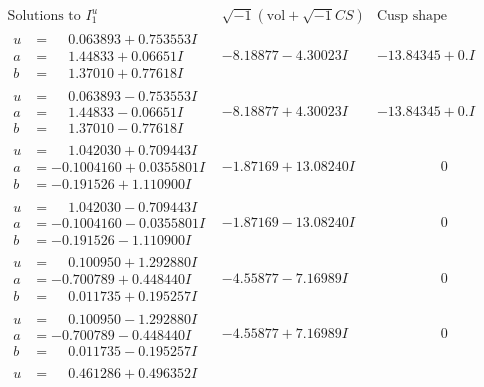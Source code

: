 \documentclass[1p]{elsarticle_modified}
\theoremstyle{definition}
\newcommand{\I}{\sqrt{-1}}
\begin{document}
$$\begin{array}{c|c|c}
\text{Solutions to }I^u_{1}& \I (\text{vol} + \sqrt{-1}CS) & \text{Cusp shape}\\
 \hline 
\begin{aligned}
u &= \phantom{-}0.063893 + 0.753553 I \\
a &= \phantom{-}1.44833 + 0.06651 I \\
b &= \phantom{-}1.37010 + 0.77618 I\end{aligned}
 & -8.18877 - 4.30023 I & -13.84345 + 0. I\phantom{ +0.000000I} \\ \hline\begin{aligned}
u &= \phantom{-}0.063893 - 0.753553 I \\
a &= \phantom{-}1.44833 - 0.06651 I \\
b &= \phantom{-}1.37010 - 0.77618 I\end{aligned}
 & -8.18877 + 4.30023 I & -13.84345 + 0. I\phantom{ +0.000000I} \\ \hline\begin{aligned}
u &= \phantom{-}1.042030 + 0.709443 I \\
a &= -0.1004160 + 0.0355801 I \\
b &= -0.191526 + 1.110900 I\end{aligned}
 & -1.87169 + 13.08240 I & \phantom{-0.000000 } 0 \\ \hline\begin{aligned}
u &= \phantom{-}1.042030 - 0.709443 I \\
a &= -0.1004160 - 0.0355801 I \\
b &= -0.191526 - 1.110900 I\end{aligned}
 & -1.87169 - 13.08240 I & \phantom{-0.000000 } 0 \\ \hline\begin{aligned}
u &= \phantom{-}0.100950 + 1.292880 I \\
a &= -0.700789 + 0.448440 I \\
b &= \phantom{-}0.011735 + 0.195257 I\end{aligned}
 & -4.55877 - 7.16989 I & \phantom{-0.000000 } 0 \\ \hline\begin{aligned}
u &= \phantom{-}0.100950 - 1.292880 I \\
a &= -0.700789 - 0.448440 I \\
b &= \phantom{-}0.011735 - 0.195257 I\end{aligned}
 & -4.55877 + 7.16989 I & \phantom{-0.000000 } 0 \\ \hline\begin{aligned}
u &= \phantom{-}0.461286 + 0.496352 I \\

\end{aligned}
\end{array}$$
\end{document}
